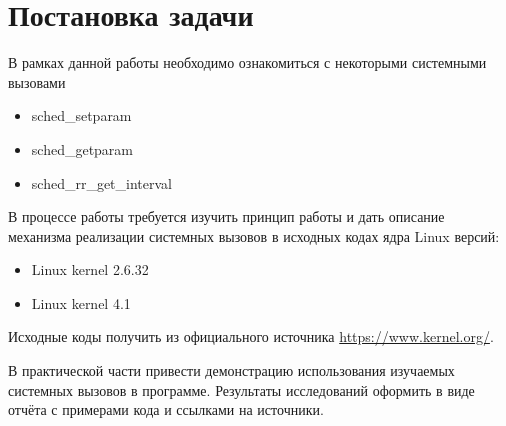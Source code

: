 \newpage
\section*{Постановка задачи}

\vspace{2em}

В рамках данной работы необходимо ознакомиться с некоторыми системными вызовами
\begin{itemize}
\item sched\_setparam
\item sched\_getparam
\item sched\_rr\_get\_interval
\end{itemize}

\vspace{1em}

В процессе работы требуется изучить принцип работы и дать описание механизма реализации системных вызовов в исходных кодах ядра Linux версий:

\begin{itemize}
\item Linux kernel 2.6.32
\item Linux kernel 4.1
\end{itemize}

Исходные коды получить из официального источника \url{https://www.kernel.org/}.

\vspace{2em}

В практической части привести демонстрацию использования изучаемых системных вызовов в программе. Результаты исследований оформить в виде отчёта с примерами кода и ссылками на источники.
